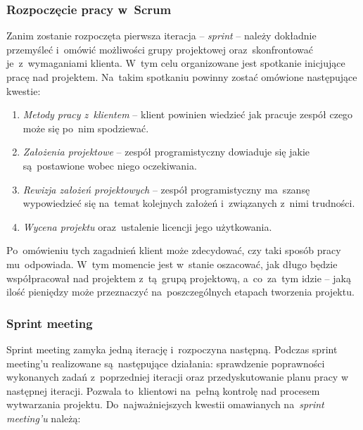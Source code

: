 \subsubsection{Rozpoczęcie pracy w~Scrum} \label{scrum.poczatki}

Zanim zostanie rozpoczęta pierwsza iteracja -- \textit{sprint} -- należy dokładnie przemyśleć i~omówić możliwości grupy projektowej oraz~skonfrontować je~z~wymaganiami klienta. W~tym celu organizowane jest spotkanie inicjujące pracę nad projektem. Na~takim spotkaniu powinny zostać omówione następujące kwestie:

\begin{enumerate}
  \item \textit{Metody pracy z~klientem} -- klient powinien wiedzieć jak pracuje zespół czego może się po~nim spodziewać.
  \item \textit{Założenia projektowe} -- zespół programistyczny dowiaduje się jakie są~postawione wobec niego oczekiwania.
  \item \textit{Rewizja założeń projektowych} -- zespół programistyczny ma~szansę wypowiedzieć się na~temat kolejnych założeń i~związanych z~nimi trudności.
  \item \textit{Wycena projektu} oraz~ustalenie licencji jego użytkowania.
\end{enumerate}

Po~omówieniu tych zagadnień klient może zdecydować, czy taki sposób pracy mu~odpowiada. W~tym momencie jest w~stanie oszacować, jak długo będzie współpracował nad projektem z~tą~grupą projektową, a~co~za~tym idzie -- jaką ilość pieniędzy może przeznaczyć na~poszczególnych etapach tworzenia projektu.

\subsubsection{Sprint meeting} \label{scrum.sprintmeeting}

Sprint meeting zamyka jedną iterację i~rozpoczyna następną. Podczas sprint meeting'u realizowane są~następujące działania: sprawdzenie poprawności wykonanych zadań z~poprzedniej iteracji oraz przedyskutowanie planu pracy w następnej iteracji. Pozwala to~klientowi na~pełną kontrolę nad procesem wytwarzania projektu. Do~najważniejszych kwestii omawianych na~\textit{sprint meeting'u} należą:

